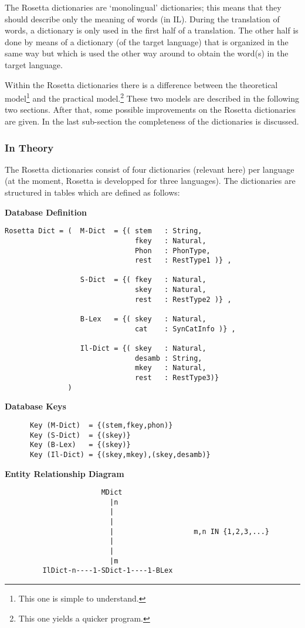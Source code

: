The Rosetta dictionaries are `monolingual' dictionaries; this means that they
should describe only the meaning of words (in IL). During the translation of 
words, a dictionary is only used in the first half of a translation. The other 
half is done by means of a dictionary (of the target language) that is 
organized in the same way but which is used the other way around to obtain the
word(s) in the target language.
 
Within the Rosetta dictionaries there is a difference between the theoretical 
model\footnote{This one is simple to understand.} and the practical 
model.\footnote{This one yields a quicker program.} These two models are 
described in the following two sections.
After that, some possible improvements on the Rosetta dictionaries are given.
In the last sub-section the completeness of the dictionaries is discussed.
 
\subsubsection{In Theory}
 
The Rosetta dictionaries consist of four dictionaries (relevant here) per 
language (at the moment, Rosetta is developped for three languages). 
The dictionaries are structured in tables which are defined as follows:
 
{\bf Database Definition}
\begin{verbatim}
Rosetta Dict = (  M-Dict  = {( stem   : String,
                               fkey   : Natural,
                               Phon   : PhonType,
                               rest   : RestType1 )} ,
      
                  S-Dict  = {( fkey   : Natural,
                               skey   : Natural,
                               rest   : RestType2 )} ,
      
                  B-Lex   = {( skey   : Natural,
                               cat    : SynCatInfo )} ,
          
                  Il-Dict = {( skey   : Natural,
                               desamb : String,
                               mkey   : Natural,
                               rest   : RestType3)}
               )
\end{verbatim}
{\bf Database Keys}
\begin{verbatim}      
      Key (M-Dict)  = {(stem,fkey,phon)}
      Key (S-Dict)  = {(skey)}
      Key (B-Lex)   = {(skey)}
      Key (Il-Dict) = {(skey,mkey),(skey,desamb)}
\end{verbatim}
\newpage
{\bf Entity Relationship Diagram}
\begin{verbatim}      
                       MDict
                         |n 
                         |
                         |
                         |                   m,n IN {1,2,3,...}
                         |
                         |
                         |m
         IlDict-n----1-SDict-1----1-BLex
\end{verbatim}      
 

